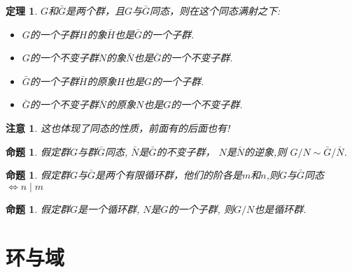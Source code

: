 \documentclass[UTF8]{ctexart}
\newtheorem{Theorem}[Definition]{定理}
\newtheorem{Remark}[Definition]{注意}
\newtheorem{Proposition}[Definition]{命题}
\begin{document}
\begin{Theorem}
$G$和$\bar{G}$是两个群，且$G$与$\bar{G}$同态，则在这个同态满射之下:
\begin{itemize}
\item[(1)] $G$的一个子群$H$的象$\bar{H}$也是$\bar{G}$的一个子群.
\item[(2)] $G$的一个不变子群$N$的象$\bar{N}$也是$\bar{G}$的一个不变子群.
\item[(1')] $\bar{G}$的一个子群$\bar{H}$的原象$H$也是$G$的一个子群.
\item[(2')] $\bar{G}$的一个不变子群$\bar{N}$的原象$N$也是$G$的一个不变子群.
\end{itemize}
\end{Theorem}

\begin{Remark}
这也体现了同态的性质，前面有的后面也有!
\end{Remark}

\begin{Proposition}
假定群$G$与群$\bar{G}$同态, $\bar{N}$是$\bar{G}$的不变子群， $N$是$\bar{N}$的逆象,则
$ G/N \sim \bar{G}/\bar{N} $.
\end{Proposition}

\begin{Proposition}
假定群$G$与$\bar{G}$是两个有限循环群，他们的阶各是$m$和$n$,则$G$与$\bar{G}$同态$\Leftrightarrow n \mid m$
\end{Proposition}

\begin{Proposition}
假定群$G$是一个循环群, $N$是$G$的一个子群, 则$G/N$也是循环群.
\end{Proposition}

\section{环与域}
\end{document}
